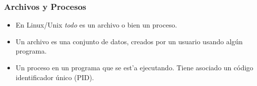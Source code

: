 \documentclass[hyperref={colorlinks}]{beamer}
\begin{document}
\begin{frame}
  \frametitle{Archivos y Procesos}
  \begin{itemize}
    \item En Linux/Unix \textit{todo} es un archivo o bien un proceso.
    \item Un archivo es una conjunto de datos, creados por un usuario usando alg\'un programa.
    \item Un proceso en un programa que se est'a ejecutando. Tiene asociado un c\'odigo identificador \'unico (PID).
  \end{itemize}
\end{frame}

\end{document}
